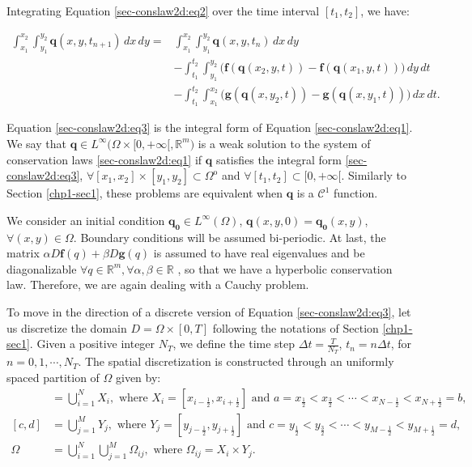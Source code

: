 Integrating Equation \eqref{sec-conslaw2d:eq2} over the time interval $[t_1,t_2]$, 
we have:

\begin{align}
	\label{sec-conslaw2d:eq3}
	\int_{x_1}^{x_2} \int_{y_1}^{y_2}
	\mathbf{q}(x, y, t_{n+1}) \,dx \,dy = &\int_{x_1}^{x_2} \int_{y_1}^{y_2}
	\mathbf{q}(x, y, t_n) \,dx \,dy \\ \nonumber
	&-\int_{t_1}^{t_2} \int_{y_1}^{y_2} \bigg(\mathbf{f}(\mathbf{q}(x_2, y, t))
	-\mathbf{f}(\mathbf{q}(x_1, y, t)) \bigg) \,dy \,dt\\ \nonumber
	&-\int_{t_1}^{t_2} \int_{x_1}^{x_2} \bigg(\mathbf{g}(\mathbf{q}(x, y_2, t))
	-\mathbf{g}(\mathbf{q}(x, y_1, t)) \bigg) \,dx \,dt.
\end{align}

Equation \eqref{sec-conslaw2d:eq3} is the integral form of Equation 
\eqref{sec-conslaw2d:eq1}. We say that $\mathbf{q} \in 
L^{\infty}{(\Omega \times [0, +\infty[}, \mathbb{R}^m)$ is a weak
solution to the system of conservation laws  \eqref{sec-conslaw2d:eq1} if $\mathbf{q}$
satisfies the integral form \eqref{sec-conslaw2d:eq3}, 
$\forall [x_1,x_2]\times[y_1,y_2] \subset \Omega^{\mathrm{o}}$ and 
$\forall [t_1,t_2] \subset [0,+\infty[$.
Similarly to Section \ref{chp1-sec1}, these problems are equivalent
when  $\mathbf{q}$ is a $\mathcal{C}^1$ function.

We consider an initial condition $\mathbf{q_0} \in L^{\infty}{(\Omega)}$,
$\mathbf{q}(x,y,0) =  \mathbf{q_0}(x,y)$, $\forall (x,y) \in \Omega$.
Boundary conditions will be assumed bi-periodic.
At last, the matrix $\alpha D\mathbf{f}(q) + \beta D\mathbf{g}(q)$ is assumed to have
real eigenvalues and be diagonalizable
$\forall q \in \mathbb{R}^m , \forall \alpha, \beta \in \mathbb{R}$
\citep{leveque:1990}, so that we have a hyperbolic conservation law.
Therefore, we are again dealing with a Cauchy problem. 

To move in the direction of a discrete version of Equation \eqref{sec-conslaw2d:eq3},
let us discretize the domain $D = \Omega \times [0,T]$ following 
the notations of Section \ref{chp1-sec1}.
Given a positive integer $N_T$, we define the time step 
$\Delta t = \frac{T}{N_T}$, $t_n = n \Delta t$, for $n = 0, 1 ,\cdots, N_T$.
The spatial discretization is constructed through an uniformly spaced partition of $\Omega$ given by:
\begin{align}
	[a,b] &= \bigcup_{i=1}^N X_i, 
	\text{ where } X_i= [x_{i-\frac{1}{2}}, x_{i+\frac{1}{2}}] \text{ and } 
	a = x_{\frac{1}{2}} < x_{\frac{3}{2}} < \cdots < x_{N-\frac{1}{2}} < x_{N+\frac{1}{2}} = b, \\
	[c,d] &= \bigcup_{j=1}^M Y_j, 
\text{ where } Y_j= [y_{j-\frac{1}{2}}, y_{j+\frac{1}{2}}] \text{ and } 
c = y_{\frac{1}{2}} < y_{\frac{3}{2}} < \cdots < y_{M-\frac{1}{2}} < y_{M+\frac{1}{2}} = d, \\
    \Omega &=  \bigcup_{i=1}^N \bigcup_{j=1}^M \Omega_{ij}, \text{ where } \Omega_{ij} = X_i \times Y_j.
\end{align}

